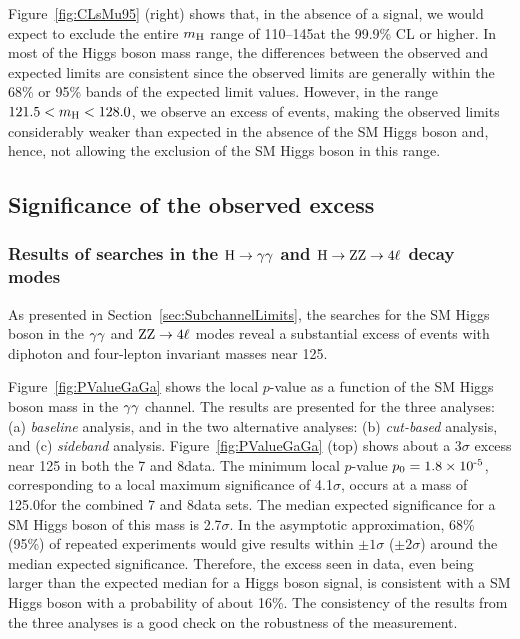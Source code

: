 \documentclass[11pt,twoside,a4paper,cmspaper,final,collab]{cms-tdr}
\begin{document}
Figure~\ref{fig:CLsMu95} (right) shows that,
in the absence of a signal, we would expect to exclude
the entire $m_{\mathrm{H}}$ range of 110--145\GeV at the 99.9\% CL or higher.
In most of the Higgs boson mass range,
the differences between the observed and expected limits are consistent
since the observed limits are generally within the
68\% or 95\% bands of the expected limit values.
However, in the range ${\relax121.5} < m_{\mathrm{H}}< {\relax128.0}$\GeV, we observe an excess of events,
making the observed limits considerably weaker than expected in the absence of the SM Higgs boson
and, hence, not allowing the exclusion of the SM Higgs boson in this range.







\subsection{Significance of the observed excess}

\subsubsection{Results of searches in the $\mathrm{H} \to \gamma\gamma$ and $\mathrm{H} \to \mathrm{Z}\mathrm{Z} \to 4\ell$ decay  modes}
\label{sec:SubchannelSignificance}

As presented in Section~\ref{sec:SubchannelLimits},
the searches for the SM Higgs boson in the $\gamma\gamma$ and $ \mathrm{Z}\mathrm{Z} \to 4\ell$ modes
reveal a substantial excess of events with diphoton and four-lepton invariant masses near 125\GeV.

Figure~\ref{fig:PValueGaGa} shows the local $p$-value as a function of the SM Higgs boson mass
in the $\gamma\gamma$ channel.
The results are presented for the three analyses:
(a) \emph{baseline} analysis,  and in the two alternative analyses:
(b) \emph{cut-based} analysis,
and (c) \emph{sideband} analysis.
Figure~\ref{fig:PValueGaGa} (top) shows about a $3\sigma$ excess near 125\GeV
in both the 7 and 8\TeV data.
The minimum local $p$-value $p_0 = 1.8\times \text{10}^\text{-5}$, corresponding to a local
maximum significance of 4.1$\sigma$, occurs at a mass of 125.0\GeV for the combined 7 and 8\TeV data sets.
The median expected significance for a SM Higgs boson of this mass
is 2.7$\sigma$. In the asymptotic approximation, 68\% (95\%) of repeated experiments would
give results within ${\pm}1 \sigma$ (${\pm}2 \sigma$) around the median expected
significance. Therefore, the excess seen in data, even being larger than the expected  median for a Higgs boson signal,
is consistent with a SM Higgs boson with a probability
of about 16\%.
The consistency of the results from the three analyses is a good check on the robustness
of the measurement.
\end{document}
